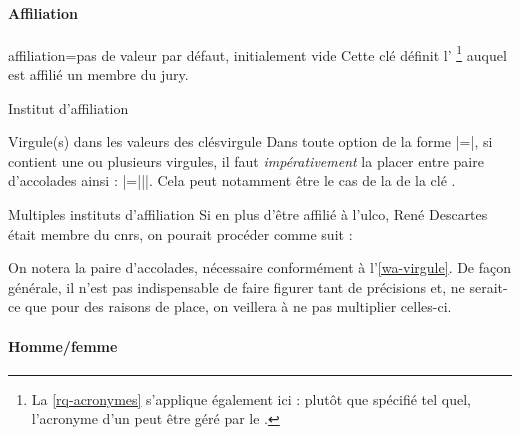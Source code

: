 \paragraph{Affiliation}
\label{sec-inst-de-prov}%
%
%

\begin{docKey}{affiliation}{=}{pas de valeur par défaut,
    initialement vide}
  Cette clé définit l'%
  \footnote{La \vref{rq-acronymes} s'applique également ici : plutôt que
    spécifié tel quel, l'acronyme d'un  peut être géré par le
    .}  auquel est affilié un membre du jury.
\end{docKey}
\begin{dbexample}{Institut d'affiliation}{}
\begin{preamblecode}[listing options={deletekeywords={[5]supervisor}}]
\end{preamblecode}
\end{dbexample}
%
\begin{dbwarning}{Virgule(s) dans les valeurs des clés}{virgule}
  Dans toute option de la forme |=|, si 
  contient une ou plusieurs virgules, il faut \emph{impérativement} la placer
  entre paire d'accolades ainsi : |={||}|. Cela peut
  notamment être le cas de la  de la clé .
\end{dbwarning}
%
\begin{dbexample}{Multiples instituts d'affiliation}{}
  Si en plus d'être affilié à l'\gls{ulco}, René Descartes était membre du
  \gls{cnrs}, on pourait procéder comme suit :
\begin{preamblecode}[]
\end{preamblecode}
On notera la paire d'accolades, nécessaire conformément
à l'\vref{wa-virgule}. De façon générale, il n'est pas indispensable de faire
figurer tant de précisions et, ne serait-ce que pour des raisons de place, on
veillera à ne pas multiplier celles-ci.
\end{dbexample}

\paragraph{Homme/femme}
\label{sec-hommefemme}%
%
%

